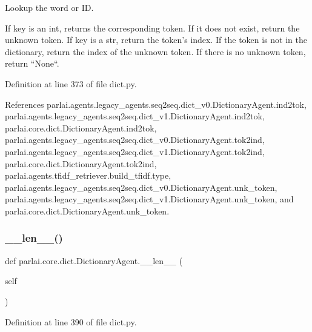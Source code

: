 \begin{DoxyVerb}Lookup the word or ID.

If key is an int, returns the corresponding token. If it does not
exist, return the unknown token.
If key is a str, return the token's index. If the token is not in the
dictionary, return the index of the unknown token. If there is no
unknown token, return ``None``.
\end{DoxyVerb}
 

Definition at line 373 of file dict.\+py.



References parlai.\+agents.\+legacy\+\_\+agents.\+seq2seq.\+dict\+\_\+v0.\+Dictionary\+Agent.\+ind2tok, parlai.\+agents.\+legacy\+\_\+agents.\+seq2seq.\+dict\+\_\+v1.\+Dictionary\+Agent.\+ind2tok, parlai.\+core.\+dict.\+Dictionary\+Agent.\+ind2tok, parlai.\+agents.\+legacy\+\_\+agents.\+seq2seq.\+dict\+\_\+v0.\+Dictionary\+Agent.\+tok2ind, parlai.\+agents.\+legacy\+\_\+agents.\+seq2seq.\+dict\+\_\+v1.\+Dictionary\+Agent.\+tok2ind, parlai.\+core.\+dict.\+Dictionary\+Agent.\+tok2ind, parlai.\+agents.\+tfidf\+\_\+retriever.\+build\+\_\+tfidf.\+type, parlai.\+agents.\+legacy\+\_\+agents.\+seq2seq.\+dict\+\_\+v0.\+Dictionary\+Agent.\+unk\+\_\+token, parlai.\+agents.\+legacy\+\_\+agents.\+seq2seq.\+dict\+\_\+v1.\+Dictionary\+Agent.\+unk\+\_\+token, and parlai.\+core.\+dict.\+Dictionary\+Agent.\+unk\+\_\+token.

\mbox{\label{classparlai_1_1core_1_1dict_1_1DictionaryAgent_a1c686bb8b03cf09dbd43943d268c2410}} 
\subsubsection{\texorpdfstring{\+\_\+\+\_\+len\+\_\+\+\_\+()}{\_\_len\_\_()}}
{\footnotesize\ttfamily def parlai.\+core.\+dict.\+Dictionary\+Agent.\+\_\+\+\_\+len\+\_\+\+\_\+ (\begin{DoxyParamCaption}\item[{}]{self }\end{DoxyParamCaption})}



Definition at line 390 of file dict.\+py.




